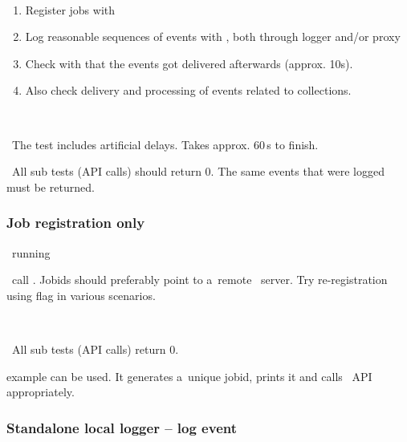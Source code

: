 \what\ 
\begin{enumerate}
\item Register jobs with  
\item Log reasonable sequences of events with , both through logger and/or proxy
\item Check with \code{edg\_wll\_JobLog} that the events got delivered afterwards (approx. 10s).
\item Also check delivery and processing of events related to collections.
\end{enumerate}

\how\ 
%

\note\ The test includes artificial delays. Takes approx. 60\,s to finish.

\result\ All sub tests (API calls) should return 0. The same events that were logged must be returned.


\subsubsection{Job registration only}
\label{reg}
\req\ running 

\what\ call . Jobids should preferably point
to a~remote \LB\ server. Try re-registration using flag  in various scenarios.

\how\ 

\result\ All sub tests (API calls) return 0.

\begin{hints}
 example can be used. It generates a~unique jobid,
prints it and calls \LB\ API appropriately.
\end{hints}



\subsubsection{Standalone local logger -- log event}
\label{log}

